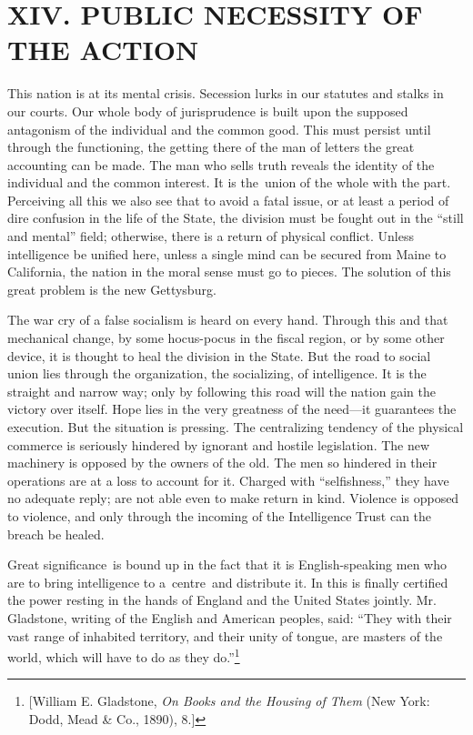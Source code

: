 \documentclass[twoside,symmetric,nobib,justified]{tufte-book}
\begin{document}
\hypertarget{xiv-public-necessity-of-the-action}{%
\section{XIV. PUBLIC NECESSITY OF THE
ACTION}\label{xiv-public-necessity-of-the-action}}

This nation is at its mental crisis. Secession lurks in our statutes and
stalks in our courts. Our whole body of jurisprudence is built upon the
supposed antagonism of the individual and the common good. This must
persist until through the functioning, the getting there of the man of
letters the great accounting can be made. The man who sells truth
reveals the identity of the individual and the common interest. It is
the~union of the whole with the part. Perceiving all this we also see
that to avoid a fatal issue, or at least a period of dire confusion in
the life of the State, the division must be fought out in the ``still
and mental'' field; otherwise, there is a return of physical conflict.
Unless intelligence be unified here, unless a single mind can be secured
from Maine to California, the nation in the moral sense must go to
pieces. The solution of this great problem is the new Gettysburg.~

The war cry of a false socialism is heard on every hand. Through this
and that mechanical change, by some hocus-pocus in the fiscal region, or
by some other device, it is thought to heal the division in the State.
But the road to social union lies through the organization, the
socializing, of intelligence. It is the straight and narrow way; only by
following this road will the nation gain the victory over itself. Hope
lies in the very greatness of the need---it guarantees the execution.
But the situation is pressing. The centralizing tendency of the physical
commerce is seriously hindered by ignorant and hostile legislation. The
new machinery is opposed by the owners of the old. The men so hindered
in their operations are at a loss to account for it. Charged with
``selfishness,'' they have no adequate reply; are not able even to make
return in kind. Violence is opposed to violence, and only through the
incoming of the Intelligence Trust can the breach be healed.~

Great significance~is bound up in the fact that it is English-speaking
men who are to bring intelligence to a~centre~and distribute it. In this
is finally certified the power resting in the hands of England and the
United States jointly. Mr. Gladstone, writing of the English and
American peoples, said: ``They with their vast range of inhabited
territory, and their unity of tongue, are masters of the world, which
will have to do as they do.''\footnote{{[}William E. Gladstone, \emph{On
  Books and the Housing of Them} (New York: Dodd, Mead \& Co., 1890),
  8.{]}}~
\end{document}
